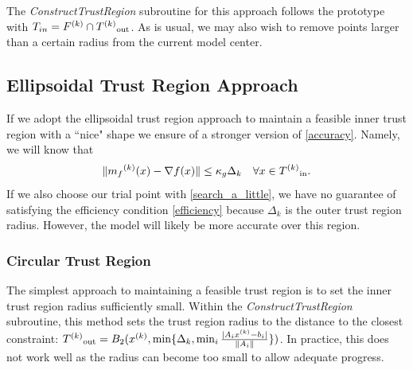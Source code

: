 The \emph{ConstructTrustRegion} subroutine for this approach follows the prototype with $T_{in} = {F}^{(k)} \cap {T^{(k)}}_{\text{out}} $.
As is usual, we may also wish to remove points larger than a certain radius from the current model center.






\subsection{Ellipsoidal Trust Region Approach}

If we adopt the ellipsoidal trust region approach to maintain a feasible inner trust region with a ``nice" shape we ensure of a stronger version of \cref{accuracy}.
Namely, we will know that 
\[
    \|{{m}_f}^{(k)}(x) - \nabla f(x) \| \le \kappa_g \Delta_{k} \quad \forall x \in {T^{(k)}}_{\text{in}}.
\]
If we also choose our trial point with \cref{search_a_little}, we have no guarantee of satisfying the efficiency condition \cref{efficiency} because $\Delta_k$ is the outer trust region radius.
However, the model will likely be more accurate over this region.


\subsubsection{Circular Trust Region}
The simplest approach to maintaining a feasible trust region is to set the inner trust region radius sufficiently small.
Within the \emph{ConstructTrustRegion} subroutine, this method sets the trust region radius to the distance to the closest constraint:
${T^{(k)}}_{\text{out}} = B_2({x}^{(k)}, \min\{\Delta_k, \min_{i}\frac{|A_i{x}^{(k)} - b_i|}{\|A_i\|} \})$.
In practice, this does not work well as the radius can become too small to allow adequate progress.

